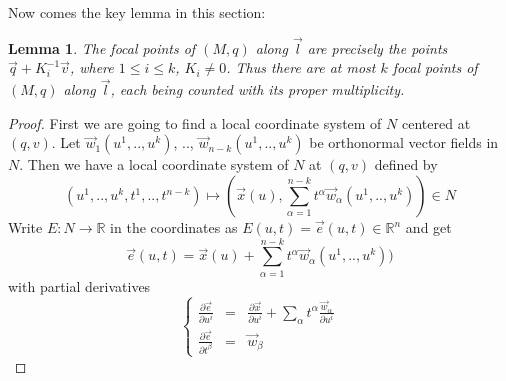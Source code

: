 \documentclass[a4paper,11pt,reqno]{amsart}
\newtheorem{lem}[thm]{Lemma}
\newcommand{\RR}{\mathbb{R}}      %
\newcommand{\vect}[1]{\vec{#1}}
\begin{document}
Now comes the key lemma in this section:

\begin{lem}
  The focal points of $(M, q)$ along $\vect{l}$  are precisely the points
  $\vect{q}+K_i^{-1}\vect{v}$, where $1 \le i \le k$, $K_i \ne 0$. Thus there
  are at most $k$ focal points of $(M,q)$ along $\vect{l}$, each being counted
  with its proper multiplicity.
\end{lem}

\begin{proof}
  First we are going to find a local coordinate system of $N$ centered at $(q,
  v)$. Let $\vect{w}_1(u^1, .., u^k)$, .., $\vect{w}_{n-k}(u^1, .., u^k)$ be
  orthonormal vector fields in $N$. Then we have a local coordinate system of
  $N$ at $(q, v)$ defined by
  \begin{equation}
    (u^1, .., u^k, t^1, .., t^{n-k}) \mapsto (\vect{x}(u),
    \sum_{\alpha=1}^{n-k}t^{\alpha} \vect{w}_{\alpha}(u^1, .., u^k)) \in N
  \end{equation}
  Write $E: N \to \RR$ in the coordinates as $E(u, t) = \vect{e}(u, t) \in
  \RR^n$ and get
  \begin{equation}
    \vect{e}(u, t) = \vect{x}(u) + \sum_{\alpha=1}^{n-k}t^{\alpha} \vect{w}_{\alpha}(u^1, .., u^k))
  \end{equation}
  with partial derivatives
  \begin{equation}
    \left\{
      \begin{array}{lcl}
        \frac{\partial \vect{e}}{\partial u^i} & = &
        \frac{\partial \vect{x}}{\partial u^i} + 
        \sum_{\alpha} t^{\alpha}\frac{\vect{w}_{\alpha}}{\partial u^i}  \\
        \frac{\partial \vect{e}}{\partial t^\beta} & = & \vect{w}_\beta
      \end{array}
    \right.
  \end{equation}
  

\end{proof}
\end{document}
